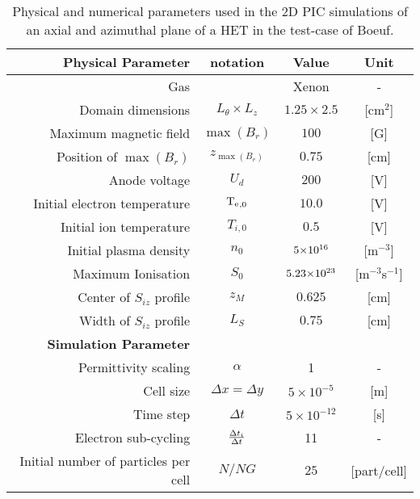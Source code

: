 \begin{table}[htb] %
     \centering
     \caption{\label{tab-parameters-boeuf} Physical and numerical parameters used in the \acs{2D} \acs{PIC} simulations of an axial and azimuthal \ztheta plane of a \acs{HET} in the test-case of Boeuf.}
     \begin{tabular}{@{}r c c c@{}} 
        \toprule
        {\bf Physical Parameter} & notation & Value & Unit \\
        \midrule
        Gas & & Xenon & - \\
        Domain dimensions & $L_{\theta} \times L_{z}$ & $1.25 \times 2.5$ & [cm$^2$] \\
        Maximum magnetic field & $\max(B_{r})$                    & $100$                 & [{G}] \\
        Position of  $\max(B_{r})$   & $z_{\max(B_{r})}$                    & $0.75$      & [cm] \\
        Anode voltage & $U_d$                    & $200$     & [V] \\
        Initial electron temperature & $\mathrm{T_e}_{,0}  $               & $10.0$                 & [{V}] \\
        Initial ion temperature & $T_{i,0}   $               & $0.5$                 & [{V}] \\
        Initial plasma density & $n_0$ & ${{5}{\times}10^{16}}$ &  [{m}$^{-3}$]\\
        Maximum Ionisation & $S_0$ & ${{5.23}{\times}10^{23}}$  & [{m}$^{-3}${s}$^{-1}$]\\
        Center of $S_{iz}$ profile & $z_M$ & $0.625$  & [{cm}]\\
        Width of $S_{iz}$ profile & $L_S$ & $0.75$  & [{cm}]\\
        \midrule
        {\bf Simulation Parameter} &  &   &  \\
        Permittivity scaling & $\alpha$ & 1 & - \\
        Cell size & $\Delta x = \Delta y$ & $5 \times 10^{-5}$  & [{m}] \\
        Time step & $\Delta t  $                      & $5 \times 10^{-12}$ & [{s}] \\
        Electron sub-cycling & $\frac{\Delta t_{i}}{\Delta t}$ & 11 & - \\
        Initial number of particles per cell & $N/NG      $    & $25$   & [{part/cell}] \\
        \bottomrule
     \end{tabular}
  \end{table}



